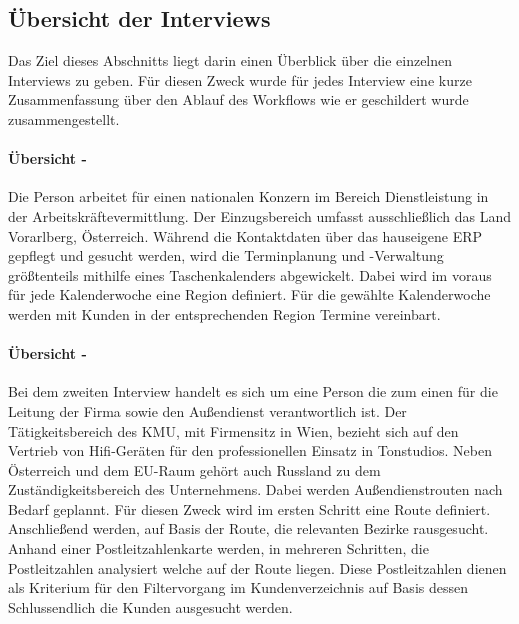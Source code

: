 \documentclass[Bachelorarbeit.tex]{subfiles}
\begin{document}
\subsection{Übersicht der Interviews}
\label{UebersichtDerInterviews}
Das Ziel dieses Abschnitts liegt darin einen Überblick über die einzelnen Interviews zu geben. 
Für diesen Zweck wurde für jedes Interview eine kurze Zusammenfassung über den Ablauf des Workflows wie er geschildert wurde zusammengestellt.

\paragraph*{Übersicht - } 

Die Person arbeitet für einen nationalen Konzern im Bereich Dienstleistung in der Arbeitskräftevermittlung. 
Der Einzugsbereich umfasst ausschließlich das Land Vorarlberg, Österreich.
Während die Kontaktdaten über das hauseigene \ac{ERP} gepflegt und gesucht werden, wird die Terminplanung und -Verwaltung größtenteils mithilfe eines Taschenkalenders abgewickelt.
Dabei wird im voraus für jede Kalenderwoche eine Region definiert. 
Für die gewählte Kalenderwoche werden mit Kunden in der entsprechenden Region Termine vereinbart.\\


\paragraph*{Übersicht - }
Bei dem zweiten Interview handelt es sich um eine Person die zum einen für die Leitung der Firma sowie den Außendienst verantwortlich ist.
Der Tätigkeitsbereich des \ac{KMU}, mit Firmensitz in Wien, bezieht sich auf den Vertrieb von Hifi-Geräten für den professionellen Einsatz in Tonstudios.
Neben Österreich und dem EU-Raum gehört auch Russland zu dem Zuständigkeitsbereich des Unternehmens.
Dabei werden Außendienstrouten nach Bedarf geplannt.
Für diesen Zweck wird im ersten Schritt eine Route definiert. 
Anschließend werden, auf Basis der Route, die relevanten Bezirke rausgesucht.
Anhand einer Postleitzahlenkarte werden, in mehreren Schritten, die Postleitzahlen analysiert welche auf der Route liegen.
Diese Postleitzahlen dienen als Kriterium für den Filtervorgang im Kundenverzeichnis auf Basis dessen Schlussendlich die Kunden ausgesucht werden.
\end{document}
